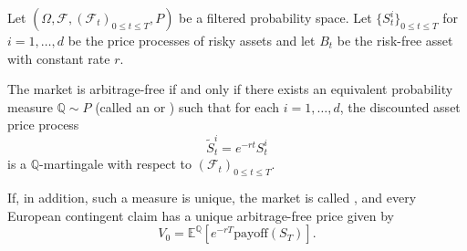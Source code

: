 \begin{theorem} \label{theorem:fundamental_theorem_of_asset_pricing_for_continuous_time_models}
Let $(\Omega, \mathcal{F}, (\mathcal{F}_t)_{0 \leq t \leq T}, P)$ be a filtered probability space. Let $\{S_t^i\}_{0 \leq t \leq T}$ for $i = 1, \dots, d$ be the price processes of risky assets and let $B_t$ be the risk-free asset with constant rate $r$.

The market is arbitrage-free if and only if there exists an equivalent probability measure $\mathbb{Q} \sim P$ (called an  or ) such that for each $i = 1, \dots, d$, the discounted asset price process
$$\tilde{S}_t^i = e^{-rt} S_t^i$$
is a $\mathbb{Q}$-martingale with respect to $(\mathcal{F}_t)_{0 \leq t \leq T}$.

If, in addition, such a measure is unique, the market is called , and every European contingent claim has a unique arbitrage-free price given by
$$V_0 = \mathbb{E}^{\mathbb{Q}}\left[e^{-rT} \text{payoff}(S_T)\right].$$
\end{theorem}